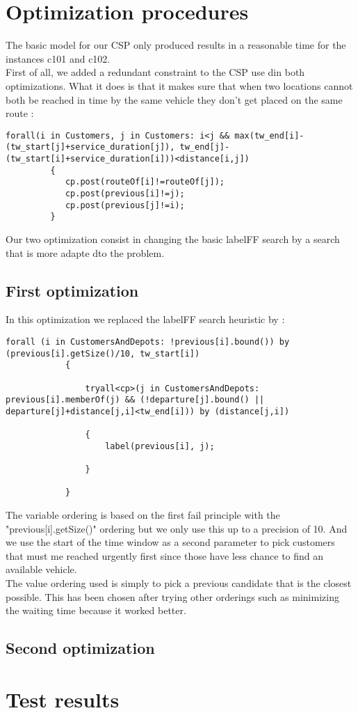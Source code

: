 \documentclass{eplDoc}
\begin{document}
\section{Optimization procedures}
The basic model for our CSP only produced results in a reasonable time for the instances c101 and c102. \\ 
First of all, we added a redundant constraint to the CSP use din both optimizations. What it does is that it makes sure that when two locations cannot both be reached in time by the same vehicle they don't get placed on the same route :  
\begin{lstlisting}
forall(i in Customers, j in Customers: i<j && max(tw_end[i]-(tw_start[j]+service_duration[j]), tw_end[j]-(tw_start[i]+service_duration[i]))<distance[i,j])
         {
            cp.post(routeOf[i]!=routeOf[j]);
            cp.post(previous[i]!=j);
            cp.post(previous[j]!=i);
         }
\end{lstlisting}

Our two optimization consist in changing the basic labelFF search by a search that is more adapte dto the problem. 
\subsection{First optimization}

In this optimization we replaced the labelFF search heuristic by : 
\begin{lstlisting}
forall (i in CustomersAndDepots: !previous[i].bound()) by (previous[i].getSize()/10, tw_start[i])
            {
               
                tryall<cp>(j in CustomersAndDepots: previous[i].memberOf(j) && (!departure[j].bound() || departure[j]+distance[j,i]<tw_end[i])) by (distance[j,i])

                {
                    label(previous[i], j);
                    
                } 
                
            }
\end{lstlisting}

The variable ordering is based on the first fail principle with the "previous[i].getSize()" ordering but we only use this up to a precision of 10. And we use the start of the time window as a second parameter to pick customers that must me reached urgently first since those have less chance to find an available vehicle. \\ 
The value ordering used is simply to pick a previous candidate that is the closest possible. This has been chosen after trying other orderings such as minimizing the waiting time because it worked better. 

\subsection{Second optimization}

\section{Test results}
\end{document}
